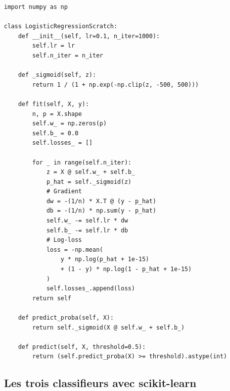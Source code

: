\begin{codeblock}[title=\textbf{R\'egression logistique depuis z\'ero}]
\begin{verbatim}
import numpy as np

class LogisticRegressionScratch:
    def __init__(self, lr=0.1, n_iter=1000):
        self.lr = lr
        self.n_iter = n_iter

    def _sigmoid(self, z):
        return 1 / (1 + np.exp(-np.clip(z, -500, 500)))

    def fit(self, X, y):
        n, p = X.shape
        self.w_ = np.zeros(p)
        self.b_ = 0.0
        self.losses_ = []

        for _ in range(self.n_iter):
            z = X @ self.w_ + self.b_
            p_hat = self._sigmoid(z)
            # Gradient
            dw = -(1/n) * X.T @ (y - p_hat)
            db = -(1/n) * np.sum(y - p_hat)
            self.w_ -= self.lr * dw
            self.b_ -= self.lr * db
            # Log-loss
            loss = -np.mean(
                y * np.log(p_hat + 1e-15)
                + (1 - y) * np.log(1 - p_hat + 1e-15)
            )
            self.losses_.append(loss)
        return self

    def predict_proba(self, X):
        return self._sigmoid(X @ self.w_ + self.b_)

    def predict(self, X, threshold=0.5):
        return (self.predict_proba(X) >= threshold).astype(int)
\end{verbatim}
\end{codeblock}

\subsection{Les trois classifieurs avec scikit-learn}

